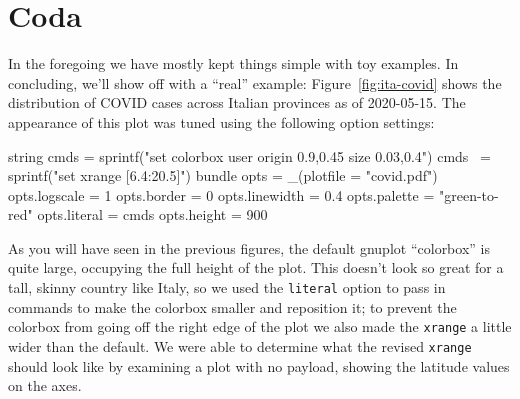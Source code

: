 \documentclass{article}
\begin{document}
\section{Coda}

In the foregoing we have mostly kept things simple with toy
examples. In concluding, we'll show off with a ``real'' example:
Figure~\ref{fig:ita-covid} shows the distribution of COVID cases
across Italian provinces as of 2020-05-15. The appearance of this plot
was tuned using the following option settings:
\begin{code}
string cmds = sprintf("set colorbox user origin 0.9,0.45 size 0.03,0.4\n")
cmds ~= sprintf("set xrange [6.4:20.5]")
bundle opts = _(plotfile = "covid.pdf")
opts.logscale = 1
opts.border = 0
opts.linewidth = 0.4
opts.palette = "green-to-red"
opts.literal = cmds
opts.height = 900
\end{code}

As you will have seen in the previous figures, the default
\textsf{gnuplot} ``colorbox'' is quite large, occupying the full
height of the plot.  This doesn't look so great for a tall, skinny
country like Italy, so we used the \texttt{literal} option to pass in
commands to make the colorbox smaller and reposition it; to prevent
the colorbox from going off the right edge of the plot we also made
the \texttt{xrange} a little wider than the default. We were able to
determine what the revised \texttt{xrange} should look like by
examining a plot with no payload, showing the latitude values on the
axes.
\end{document}
